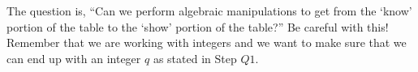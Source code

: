 \begin{previewactivity}
The question is, ``Can we perform algebraic manipulations to get from the `know' portion of the table to the `show' portion of the table?''
Be careful with this!  Remember that we are working with integers and we want to make sure that we can end up with an integer  $q$  as stated in Step $Q1$.
\end{previewactivity}
\hbreak
%
